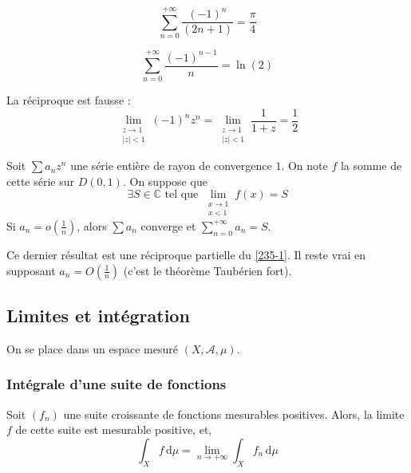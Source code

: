 	\begin{application}
		\[ \sum_{n=0}^{+\infty} \frac{(-1)^n}{(2n+1)} = \frac{\pi}{4} \]
	\end{application}
	
	\begin{application}
		\[ \sum_{n=0}^{+\infty} \frac{(-1)^{n-1}}{n} = \ln(2) \]
	\end{application}
	
	\begin{cexample}
		La réciproque est fausse :
		\[ \lim_{\substack{z \rightarrow 1 \\ \vert z \vert < 1}} (-1)^n z^n = \lim_{\substack{z \rightarrow 1 \\ \vert z \vert < 1}} \frac{1}{1+z} = \frac{1}{2} \]
	\end{cexample}
	
	\begin{theorem}
		Soit $\sum a_n z^n$ une série entière de rayon de convergence $1$. On note $f$ la somme de cette série sur $D(0,1)$. On suppose que
		\[ \exists S \in \mathbb{C} \text{ tel que } \lim_{\substack{x \rightarrow 1 \\ x < 1}} f(x) = S \]
		Si $a_n = o \left( \frac{1}{n} \right)$, alors $\sum a_n$ converge et $\sum_{n=0}^{+\infty} a_n = S$.
	\end{theorem}
	
	\begin{remark}
		Ce dernier résultat est une réciproque partielle du \cref{235-1}. Il reste vrai en supposant $a_n = O \left( \frac{1}{n} \right)$ (c'est le théorème Taubérien fort).
	\end{remark}
	
	\subsection{Limites et intégration}
	
	On se place dans un espace mesuré $(X, \mathcal{A}, \mu)$.
	
	\subsubsection{Intégrale d'une suite de fonctions}
	
	
	\begin{theorem}
		Soit $(f_n)$ une suite croissante de fonctions mesurables positives. Alors, la limite $f$ de cette suite est mesurable positive, et,
		\[ \int_X f \, \mathrm{d}\mu = \lim_{n \rightarrow +\infty} \int_X f_n \, \mathrm{d}\mu \]
	\end{theorem}
	
